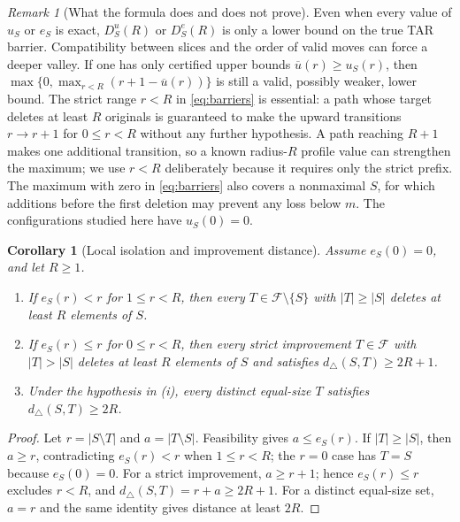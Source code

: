 \documentclass[11pt]{article}
\newtheorem{corollary}[theorem]{Corollary}
\theoremstyle{definition}
\theoremstyle{remark}
\newtheorem{remark}[theorem]{Remark}
\newcommand{\F}{\mathcal{F}}
\newcommand{\dist}{d_{\triangle}}
\begin{document}
\begin{remark}[What the formula does and does not prove]
Even when every value of $u_S$ or $e_S$ is exact, $D^u_S(R)$ or
$D^e_S(R)$ is only a lower bound on the true TAR barrier.  Compatibility
between slices and the order of valid moves can force a deeper valley.  If one
has only certified upper bounds $\overline u(r)\ge u_S(r)$, then
$\max\{0,\max_{r<R}(r+1-\overline u(r))\}$ is still a valid, possibly weaker,
lower bound.
The strict range $r<R$ in \eqref{eq:barriers} is essential: a path whose target
deletes at least $R$ originals is guaranteed to make the upward transitions
$r\to r+1$ for $0\le r<R$ without any further hypothesis.  A path reaching
$R+1$ makes one additional transition, so a known radius-$R$ profile value can
strengthen the maximum; we use $r<R$ deliberately because it requires only the
strict prefix.  The maximum with zero in \eqref{eq:barriers} also covers a
nonmaximal $S$, for which additions before the first deletion may prevent any
loss below $m$.  The configurations studied here have $u_S(0)=0$.
\end{remark}

\begin{corollary}[Local isolation and improvement distance]
\label{cor:distance}
Assume $e_S(0)=0$, and let $R\ge1$.
\begin{enumerate}[label=(\roman*),leftmargin=*]
  \item If $e_S(r)<r$ for $1\le r<R$, then every $T\in\F\setminus\{S\}$
  with $|T|\ge|S|$ deletes at least $R$ elements of $S$.
  \item If $e_S(r)\le r$ for $0\le r<R$, then every strict improvement
  $T\in\F$ with $|T|>|S|$ deletes at least $R$ elements of $S$ and satisfies
  $\dist(S,T)\ge2R+1$.
  \item Under the hypothesis in (i), every distinct equal-size $T$ satisfies
  $\dist(S,T)\ge2R$.
\end{enumerate}
\end{corollary}

\begin{proof}
Let $r=|S\setminus T|$ and $a=|T\setminus S|$.  Feasibility gives
$a\le e_S(r)$.  If $|T|\ge|S|$, then $a\ge r$, contradicting
$e_S(r)<r$ when $1\le r<R$; the $r=0$ case has $T=S$ because $e_S(0)=0$.
For a strict improvement, $a\ge r+1$; hence
$e_S(r)\le r$ excludes $r<R$, and
$\dist(S,T)=r+a\ge2R+1$.  For a distinct equal-size set, $a=r$ and the same
identity gives distance at least $2R$.
\end{proof}
\end{document}
